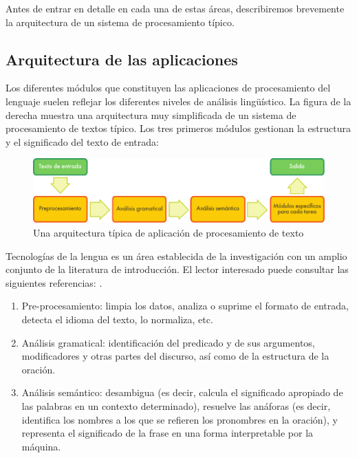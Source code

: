 \begin{multicols}{2}
Antes de entrar en detalle en cada una de estas áreas, describiremos brevemente la arquitectura de un sistema de procesamiento típico. 

\subsection{Arquitectura de las aplicaciones}

Los diferentes módulos que constituyen las aplicaciones de procesamiento del lenguaje suelen reflejar los diferentes niveles de análisis lingüístico. La figura de la derecha muestra una arquitectura muy simplificada de un sistema de procesamiento de textos típico. Los tres primeros módulos gestionan la estructura y el significado del texto de entrada:

\begin{figure}[b]
  \center
  \includegraphics[width=\textwidth]{../_media/spanish/text_processing_app_architecture}
  \caption{Una arquitectura típica de aplicación de procesamiento de texto}
  \label{fig:textprocessingarch_de}
\end{figure}

Tecnologías de la lengua es un área establecida de la investigación con un amplio conjunto de la literatura de introducción. El lector interesado puede consultar las siguientes referencias: \cite{jurafsky-martin01,manning-schuetze1,lt-world1,lt-survey1}.

\begin{enumerate}
  \item	Pre-procesamiento: limpia los datos, analiza o suprime el formato de entrada, detecta el idioma del texto, lo normaliza, etc.
  \item	Análisis gramatical: identificación del predicado y de sus argumentos, modificadores y otras partes del discurso, así como de la estructura de la oración.
  \item	Análisis semántico: desambigua (es decir, calcula el significado apropiado de las palabras en un contexto determinado), resuelve las anáforas (es decir, identifica los nombres a los que se refieren los pronombres en la oración), y representa el significado de la frase en una forma interpretable por la máquina.
\end{enumerate}


\end{multicols}
